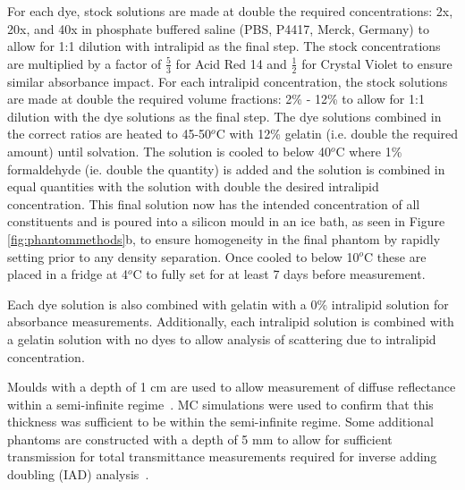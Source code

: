 \label{sec:methodsphantomsynthesis}
For each dye, stock solutions are made at double the required concentrations: 2x, 20x, and 40x in phosphate buffered saline (PBS, P4417, Merck, Germany) to allow for 1:1 dilution with intralipid as the final step. The stock concentrations are multiplied by a factor of $\frac{5}{3}$ for Acid Red 14 and $\frac{1}{2}$ for Crystal Violet to ensure similar absorbance impact. For each intralipid concentration, the stock solutions are made at double the required volume fractions: 2\% - 12\% to allow for 1:1 dilution with the dye solutions as the final step. The dye solutions combined in the correct ratios are heated to 45-50$^o$C with 12\% gelatin (i.e. double the required amount) until solvation. The solution is cooled to below 40$^o$C where 1\% formaldehyde (ie. double the quantity) is added and the solution is combined in equal quantities with the solution with double the desired intralipid concentration. This final solution now has the intended concentration of all constituents and is poured into a silicon mould in an ice bath, as seen in Figure \ref{fig:phantommethods}b, to ensure homogeneity in the final phantom by rapidly setting prior to any density separation. Once cooled to below 10$^o$C these are placed in a fridge at 4$^o$C to fully set for at least 7 days before measurement. 

Each dye solution is also combined with gelatin with a 0\% intralipid solution for absorbance measurements.
Additionally, each intralipid solution is combined with a gelatin solution with no dyes to allow analysis of scattering due to intralipid concentration.

Moulds with a depth of 1 cm are used to allow measurement of diffuse reflectance within a semi-infinite regime~\citep{Zhang2014}.
MC simulations were used to confirm that this thickness was sufficient to be within the semi-infinite regime.
Some additional phantoms are constructed with a depth of 5 mm to allow for sufficient transmission for total transmittance measurements required for inverse adding doubling (IAD) analysis~\citep{Prahl2017}. 


